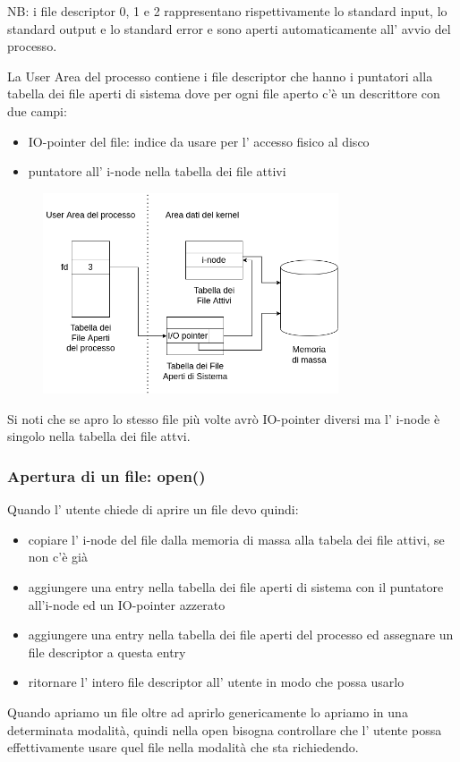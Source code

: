 NB: i file descriptor 0, 1 e 2 rappresentano rispettivamente lo standard input, lo standard output e lo standard error e sono aperti automaticamente all' avvio del processo.

La User Area del processo contiene i file descriptor che hanno i puntatori alla tabella dei file aperti di sistema dove per ogni file aperto c'è un descrittore con due campi:
\begin{itemize}
    \item IO-pointer del file: indice da usare per l' accesso fisico al disco
    \item puntatore all' i-node nella tabella dei file attivi
\end{itemize}

\begin{figure}[H]
    \centering
    \includegraphics[width=330px]{images/13_UNIX_Linux/kernel_file_data_structure.png}
\end{figure}

Si noti che se apro lo stesso file più volte avrò IO-pointer diversi ma l' i-node è singolo nella tabella dei file attvi.

\subsubsection{Apertura di un file: open()}
Quando l' utente chiede di aprire un file devo quindi:
\begin{itemize}
    \item copiare l' i-node del file dalla memoria di massa alla tabela dei file attivi, se non c'è già
    \item aggiungere una entry nella tabella dei file aperti di sistema con il puntatore all'i-node ed un IO-pointer azzerato
    \item aggiungere una entry nella tabella dei file aperti del processo ed assegnare un file descriptor a questa entry
    \item ritornare l' intero file descriptor all' utente in modo che possa usarlo
\end{itemize}
Quando apriamo un file oltre ad aprirlo genericamente lo apriamo in una determinata modalità, quindi nella open bisogna controllare che l' utente possa effettivamente usare quel file nella modalità che sta richiedendo.

